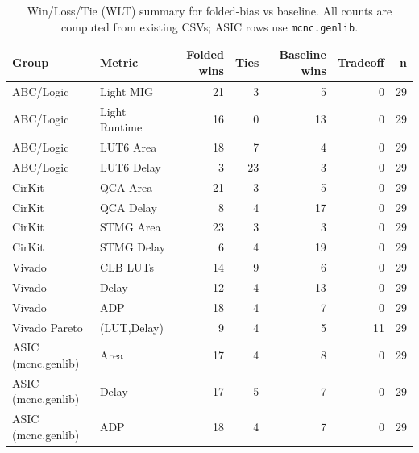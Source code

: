 \begin{table}[t]
\centering
\scriptsize
\setlength{\tabcolsep}{3.2pt}
\renewcommand{\arraystretch}{1.05}
\caption{Win/Loss/Tie (WLT) summary for folded-bias vs baseline. All counts are computed from existing CSVs; ASIC rows use \texttt{mcnc.genlib}.}
\label{tab:cross_tool_wlt}
\begin{tabular}{l l r r r r r}
\hline
Group & Metric & Folded wins & Ties & Baseline wins & Tradeoff & n \\
\hline
ABC/Logic & Light MIG & 21 & 3 & 5 & 0 & 29 \\
ABC/Logic & Light Runtime & 16 & 0 & 13 & 0 & 29 \\
ABC/Logic & LUT6 Area & 18 & 7 & 4 & 0 & 29 \\
ABC/Logic & LUT6 Delay & 3 & 23 & 3 & 0 & 29 \\
CirKit & QCA Area & 21 & 3 & 5 & 0 & 29 \\
CirKit & QCA Delay & 8 & 4 & 17 & 0 & 29 \\
CirKit & STMG Area & 23 & 3 & 3 & 0 & 29 \\
CirKit & STMG Delay & 6 & 4 & 19 & 0 & 29 \\
Vivado & CLB LUTs & 14 & 9 & 6 & 0 & 29 \\
Vivado & Delay & 12 & 4 & 13 & 0 & 29 \\
Vivado & ADP & 18 & 4 & 7 & 0 & 29 \\
Vivado Pareto & (LUT,Delay) & 9 & 4 & 5 & 11 & 29 \\
ASIC (mcnc.genlib) & Area & 17 & 4 & 8 & 0 & 29 \\
ASIC (mcnc.genlib) & Delay & 17 & 5 & 7 & 0 & 29 \\
ASIC (mcnc.genlib) & ADP & 18 & 4 & 7 & 0 & 29 \\
\hline
\end{tabular}
\end{table}
